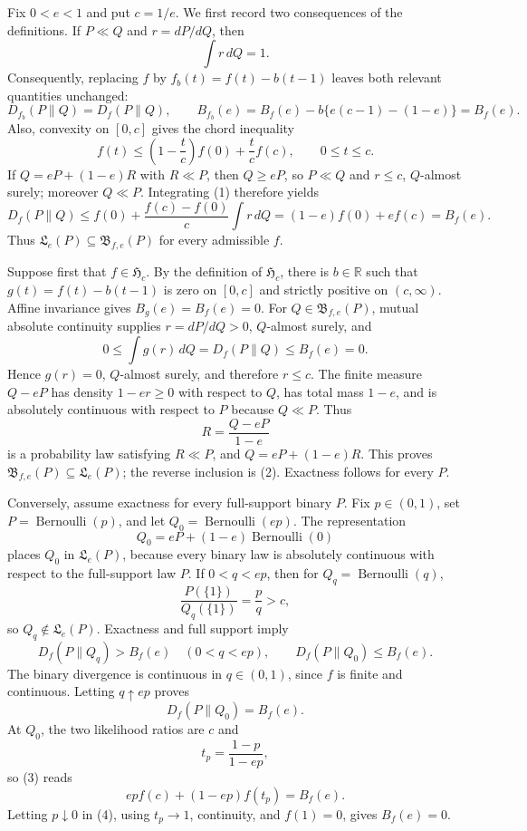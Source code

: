 Fix \(0<e<1\) and put \(c=1/e\).  We first record two consequences of the definitions.  If \(P\ll Q\) and \(r=dP/dQ\), then
\[
 \int r\,dQ=1.
\]
Consequently, replacing \(f\) by \(f_b(t)=f(t)-b(t-1)\) leaves both relevant quantities unchanged:
\[
 D_{f_b}(P\|Q)=D_f(P\|Q),\qquad
 B_{f_b}(e)=B_f(e)-b\{e(c-1)-(1-e)\}=B_f(e).
\]
Also, convexity on \([0,c]\) gives the chord inequality
\[
 f(t)\le \left(1-\frac{t}{c}\right)f(0)+\frac{t}{c}f(c),\qquad 0\le t\le c. \tag{1}
\]
If \(Q=eP+(1-e)R\) with \(R\ll P\), then \(Q\ge eP\), so \(P\ll Q\) and \(r\le c\), \(Q\)-almost surely; moreover \(Q\ll P\).  Integrating (1) therefore yields
\[
 D_f(P\|Q)
 \le f(0)+\frac{f(c)-f(0)}{c}\int r\,dQ
 =(1-e)f(0)+ef(c)=B_f(e). \tag{2}
\]
Thus \(\mathfrak L_e(P)\subseteq\mathfrak B_{f,e}(P)\) for every admissible \(f\).

Suppose first that \(f\in\mathfrak H_c\).  By the definition of \(\mathfrak H_c\), there is \(b\in\mathbb R\) such that \(g(t)=f(t)-b(t-1)\) is zero on \([0,c]\) and strictly positive on \((c,\infty)\).  Affine invariance gives \(B_g(e)=B_f(e)=0\).  For \(Q\in\mathfrak B_{f,e}(P)\), mutual absolute continuity supplies \(r=dP/dQ>0\), \(Q\)-almost surely, and
\[
 0\le \int g(r)\,dQ=D_f(P\|Q)\le B_f(e)=0.
\]
Hence \(g(r)=0\), \(Q\)-almost surely, and therefore \(r\le c\).  The finite measure \(Q-eP\) has density \(1-er\ge0\) with respect to \(Q\), has total mass \(1-e\), and is absolutely continuous with respect to \(P\) because \(Q\ll P\).  Thus
\[
 R=\frac{Q-eP}{1-e}
\]
is a probability law satisfying \(R\ll P\), and \(Q=eP+(1-e)R\).  This proves \(\mathfrak B_{f,e}(P)\subseteq\mathfrak L_e(P)\); the reverse inclusion is (2).  Exactness follows for every \(P\).

Conversely, assume exactness for every full-support binary \(P\).  Fix \(p\in(0,1)\), set \(P=\operatorname{Bernoulli}(p)\), and let \(Q_0=\operatorname{Bernoulli}(ep)\).  The representation
\[
 Q_0=eP+(1-e)\operatorname{Bernoulli}(0)
\]
places \(Q_0\) in \(\mathfrak L_e(P)\), because every binary law is absolutely continuous with respect to the full-support law \(P\).  If \(0<q<ep\), then for \(Q_q=\operatorname{Bernoulli}(q)\),
\[
 \frac{P(\{1\})}{Q_q(\{1\})}=\frac pq>c,
\]
so \(Q_q\notin\mathfrak L_e(P)\).  Exactness and full support imply
\[
 D_f(P\|Q_q)>B_f(e)\quad(0<q<ep),
 \qquad D_f(P\|Q_0)\le B_f(e).
\]
The binary divergence is continuous in \(q\in(0,1)\), since \(f\) is finite and continuous.  Letting \(q\uparrow ep\) proves
\[
 D_f(P\|Q_0)=B_f(e). \tag{3}
\]
At \(Q_0\), the two likelihood ratios are \(c\) and
\[
 t_p=\frac{1-p}{1-ep},
\]
so (3) reads
\[
 ep f(c)+(1-ep)f(t_p)=B_f(e). \tag{4}
\]
Letting \(p\downarrow0\) in (4), using \(t_p\to1\), continuity, and \(f(1)=0\), gives \(B_f(e)=0\).

